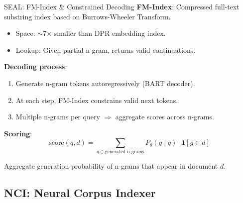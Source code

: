 \documentclass[aspectratio=169,11pt]{beamer}
\newcommand{\score}{\text{score}}
\begin{document}
\begin{frame}{SEAL: FM-Index \& Constrained Decoding}
\textbf{FM-Index}: Compressed full-text substring index based on Burrows-Wheeler Transform.
\begin{itemize}
    \item Space: $\sim$7$\times$ smaller than DPR embedding index.
    \item Lookup: Given partial n-gram, returns valid continuations.
\end{itemize}

\vspace{0.3cm}
\textbf{Decoding process}:
\begin{enumerate}
    \item Generate n-gram tokens autoregressively (BART decoder).
    \item At each step, FM-Index constrains valid next tokens.
    \item Multiple n-grams per query $\Rightarrow$ aggregate scores across n-grams.
\end{enumerate}

\vspace{0.3cm}
\textbf{Scoring}:
\[
\score(q, d) = \sum_{g \in \text{generated n-grams}} P_\theta(g \mid q) \cdot \mathbf{1}[g \in d]
\]

Aggregate generation probability of n-grams that appear in document $d$.
\end{frame}


\subsection{NCI: Neural Corpus Indexer}
\end{document}
